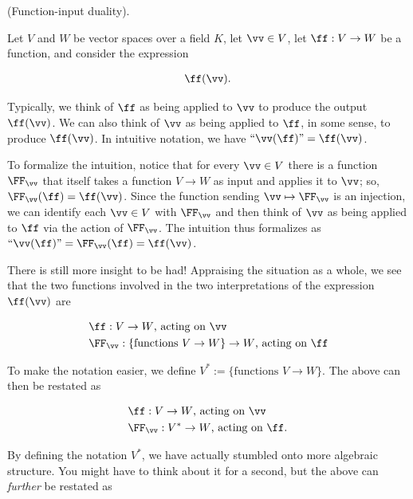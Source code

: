 \begin{deriv}
\label{ch::appendix::deriv::function_input_duality}
    (Function-input duality).
    
    Let $V$ and $W$ be vector spaces over a field $K$, let $\vv \in V$, let $\ff:V \rightarrow W$ be a function, and consider the expression
    
    \begin{align*}
    	\ff(\vv).
    \end{align*}

    Typically, we think of $\ff$ as being applied to $\vv$ to produce the output $\ff(\vv)$. We can also think of $\vv$ as being applied to $\ff$, in some sense, to produce $\ff(\vv)$. In intuitive notation, we have $\text{``}\vv(\ff)\text{''} = \ff(\vv)$.

    To formalize the intuition, notice that for every $\vv \in V$ there is a function $\FF_{\vv}$ that itself takes a function $V \rightarrow W$ as input and applies it to $\vv$; so, $\FF_{\vv}(\ff) = \ff(\vv)$. Since the function sending $\vv \mapsto \FF_{\vv}$ is an injection, we can identify each $\vv \in V$ with $\FF_{\vv}$ and then think of $\vv$ as being applied to $\ff$ via the action of $\FF_{\vv}$. The intuition thus formalizes as $\text{``}\vv(\ff)\text{''} = \FF_{\vv}(\ff) = \ff(\vv)$.

	\vspace{.25cm}

    There is still more insight to be had! Appraising the situation as a whole, we see that the two functions involved in the two interpretations of the expression $\ff(\vv)$ are
    
    \begin{align*}
    	&\ff:V \rightarrow W \text{, acting on $\vv$}\\
    	&\FF_{\vv}:\{\text{functions $V \rightarrow W$}\} \rightarrow W \text{, acting on $\ff$}
   	\end{align*}
   	
   	To make the notation easier, we define $V^* := \{\text{functions $V \rightarrow W$}\}$. The above can then be restated as
   	
   	\begin{align*}
   		&\ff:V \rightarrow W \text{, acting on $\vv$} \\
   		&\FF_{\vv}:V^* \rightarrow W \text{, acting on $\ff$}.
   	\end{align*}

	By defining the notation $V^*$, we have actually stumbled onto more algebraic structure. You might have to think about it for a second, but the above can \textit{further} be restated as


\end{deriv}
